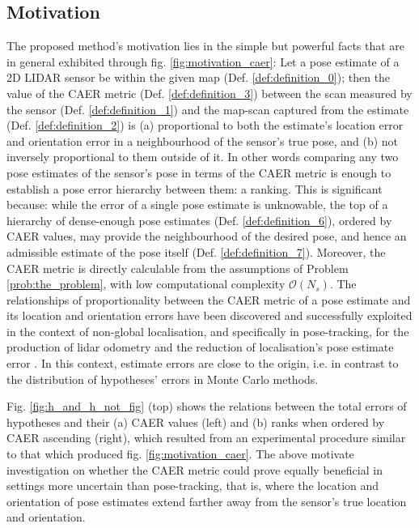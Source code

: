 \subsection{Motivation}
\label{subsec:motivation}

The proposed method's motivation lies in the simple but powerful facts that are
in general exhibited through fig. \ref{fig:motivation_caer}: Let a pose
estimate of a 2D LIDAR sensor be within the given map (Def.
\ref{def:definition_0}); then the value of the CAER metric (Def.
\ref{def:definition_3}) between the scan measured by the sensor (Def.
\ref{def:definition_1}) and the map-scan captured from the estimate (Def.
\ref{def:definition_2}) is (a) proportional to both the estimate's location
error and orientation error in a neighbourhood of the sensor's true pose, and
(b) not inversely proportional to them outside of it. In other words comparing
any two pose estimates of the sensor's pose in terms of the CAER metric is
enough to establish a pose error hierarchy between them: a ranking.  This is
significant because: while the error of a single pose estimate is unknowable,
the top of a hierarchy of dense-enough pose estimates (Def.
\ref{def:definition_6}), ordered by CAER values, may provide the neighbourhood
of the desired pose, and hence an admissible estimate of the pose itself (Def.
\ref{def:definition_7}).  Moreover, the CAER metric is directly calculable
from the assumptions of Problem \ref{prob:the_problem}, with low computational
complexity $\mathcal{O}(N_s)$.
The relationships of proportionality between the CAER
metric of a pose estimate and its location and orientation errors have been
discovered and successfully exploited in the context of non-global
localisation, and specifically in pose-tracking, for the production of lidar
odometry \cite{Filotheou2022f} and the reduction of localisation's pose
estimate error \cite{Filotheou2023a}. In this context, estimate errors are
close to the origin, i.e. in contrast to the distribution of hypotheses' errors
in Monte Carlo methods.

Fig. \ref{fig:h_and_h_not_fig} (top) shows the relations between the total
errors of hypotheses and their (a) CAER values (left) and (b) ranks when ordered
by CAER ascending (right), which resulted from an experimental procedure
similar to that which produced fig. \ref{fig:motivation_caer}. The above
motivate investigation on whether the CAER metric could prove equally
beneficial in settings more uncertain than pose-tracking, that is, where the
location and orientation of pose estimates extend farther away from the
sensor's true location and orientation.



